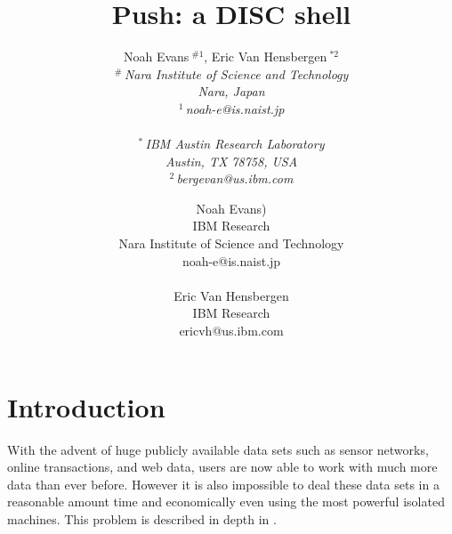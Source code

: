 \documentclass[10pt,conference,letterpaper]{IEEEtran}
\title{Push: a DISC shell}
\author{%
{Noah Evans{\small $~^{\#1}$}, Eric Van Hensbergen{\small $~^{*2}$} }%
\vspace{1.6mm}\\
\fontsize{10}{10}\selectfont\itshape
$^{\#}$\,Nara Institute of Science and Technology\\
Nara, Japan\\
\fontsize{9}{9}\selectfont\ttfamily\upshape
$^{1}$\,noah-e@is.naist.jp\\
\vspace{1.2mm}\\
\fontsize{10}{10}\selectfont\rmfamily\itshape
$^{*}$\,IBM Austin Research Laboratory\\
Austin, TX 78758, USA\\
\fontsize{9}{9}\selectfont\ttfamily\upshape
$^{2}$\,bergevan@us.ibm.com
}
\author{Noah Evans)\\
IBM Research\\
Nara Institute of Science and Technology\\
noah-e@is.naist.jp\\\\
Eric Van Hensbergen\\
IBM Research\\
ericvh@us.ibm.com\\
}
\begin{document}
\maketitle

%
%
%

\renewcommand{\topfraction}{0.85}
\renewcommand{\textfraction}{0.1}



\section{Introduction}

With the advent of huge publicly available data sets such as sensor networks, online transactions, and web data, users are now able to work with much more data than ever before. However it is also impossible to deal these data sets in a reasonable amount time and economically even using the most powerful isolated machines. This problem is described in depth in \cite{barroso2003wsp}.
\end{document}
